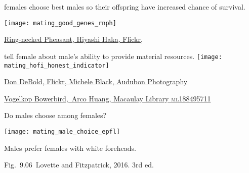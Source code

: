 \documentclass[t]{beamer}
\newcommand{\cornell}[1]{Fig.~#1~Lovette and Fitzpatrick, 2016. 3rd ed.}
\begin{document}

\begin{frame}[t]{ females choose best males so their offspring have increased chance of survival.}

\vspace{-0.5\baselineskip}
\centering
\texttt{[image: mating\_good\_genes\_rnph]}

\vfilll

\tinyfill \href{https://www.flickr.com/photos/36542741@N03/4454127334}{Ring-necked Pheasant, Hiyashi Haka, Flickr, }

\end{frame}


\begin{frame}[t]{ tell female about male's ability to provide material resources.}
\vspace{-0.5\baselineskip}
\centering
\texttt{[image: mating\_hofi\_honest\_indicator]}

\vfilll

\tiny \href{https://www.flickr.com/photos/28156071@N00/4104955050}{Don DeBold, Flickr, } \hfill \href{https://www.audubon.org/news/house-finch-or-purple-finch-heres-how-tell-them-apart}{Michele Black, Audubon Photography}


\end{frame}


{
\begin{frame}[b,plain]
	
	\tinyfill \textcolor{white}{ \href{https://macaulaylibrary.org/asset/188495711}{Vogelkop Bowerbird, \textcopyright\,Arco Huang, Macaulay Library \textsc{ml188495711}}} 
\end{frame}
}



\begin{frame}[t]{Do males choose among females?}

\vspace{-0.5\baselineskip}
\texttt{[image: mating\_male\_choice\_epfl]}

\hangpara \hfill Males prefer females with white foreheads.

\vfilll

\tinyfill \cornell{9.06}

\end{frame}
\end{document}
